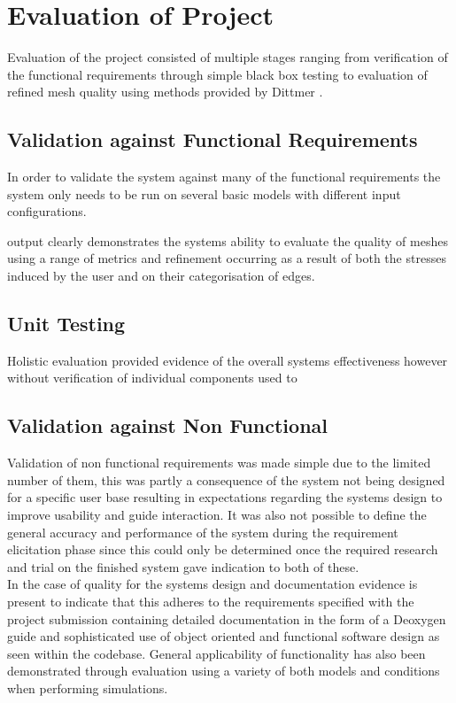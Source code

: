 
\section{Evaluation of Project}
Evaluation of the project consisted of multiple stages ranging from verification of the functional requirements through simple black box testing to evaluation of refined mesh quality using methods provided by Dittmer \cite{DittmerMeshQualityMet}. 

\subsection{Validation against Functional Requirements}
In order to validate the system against many of the functional requirements the system only needs to be run on several basic models with different input configurations. 

output clearly demonstrates the systems ability to evaluate the quality of meshes using a range of metrics and refinement occurring as a result of both the stresses induced by the user and on their categorisation of edges. 

\subsection{Unit Testing}
Holistic evaluation provided evidence of the overall systems effectiveness however without verification of individual components used to 




\subsection{Validation against Non Functional}
Validation of non functional requirements was made simple due to the limited number of them, this was partly a consequence of the system not being designed for a specific user base resulting in expectations regarding the systems design to improve usability and guide interaction. It was also not possible to define the general accuracy and performance of the system during the requirement elicitation phase since this could only be determined once the required research and trial on the finished system gave indication to both of these. \\


\noindent
In the case of quality for the systems design and documentation evidence is present to indicate that this adheres to the requirements specified with the project submission containing detailed documentation in the form of a Deoxygen guide and sophisticated use of object oriented and functional software design as seen within the codebase. General applicability of functionality has also been demonstrated through evaluation using a variety of both models and conditions when performing simulations.

